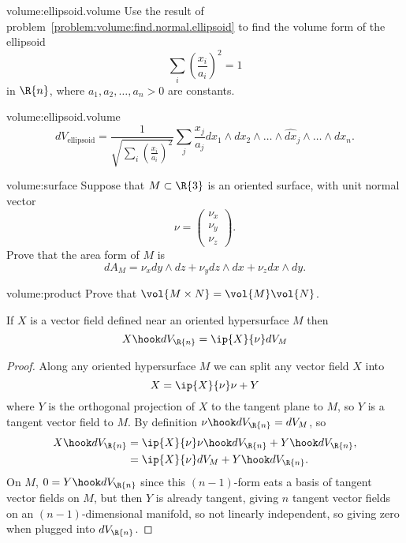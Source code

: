 \begin{problem}{volume:ellipsoid.volume}
Use the result of problem~\vref{problem:volume:find.normal.ellipsoid}
to find the volume form of the ellipsoid
\[
\sum_i \left(\frac{x_i}{a_i}\right)^2 = 1
\]
in \(\R{n}\), where \(a_1, a_2, \dots, a_n > 0\) are constants.
\end{problem}
\begin{answer}{volume:ellipsoid.volume}
\[
dV_{\text{ellipsoid}}
=
\frac{1}{\sqrt{\sum_i \left(\frac{x_i}{a_i}\right)^2}}
\sum_j \frac{x_j}{a_j}
dx_1 \wedge dx_2 \wedge \dots \wedge \widehat{dx}_j \wedge
\dots \wedge dx_n.
\]
\end{answer}

\begin{problem}{volume:surface}
Suppose that \(M \subset \R{3}\) is an oriented surface, with unit normal vector
\[
\nu
=
\begin{pmatrix}
\nu_x \\
\nu_y \\
\nu_z
\end{pmatrix}.
\]
Prove that the area form of \(M\) is
\[
dA_M = \nu_x dy \wedge dz + \nu_y dz \wedge dx + \nu_z dx \wedge dy.
\]
\end{problem}

\begin{problem}{volume:product}
Prove that \(\vol{M \times N}=\vol{M} \vol{N}\).
\end{problem}




\begin{lemma}
If \(X\) is a vector field defined near an oriented hypersurface \(M\) then
\[
X \hook dV_{\R{n}} = \ip{X}{\nu} dV_M
\]
\end{lemma}
\begin{proof}
Along any oriented hypersurface \(M\) we can split any vector field \(X\) into 
\[
X = \ip{X}{\nu} \nu + Y
\]
where \(Y\) is the orthogonal projection of \(X\) to the tangent plane to \(M\), so \(Y\) is a tangent vector field to \(M\).
By definition \(\nu \hook dV_{\R{n}} = dV_M\), so
\begin{align*}
X \hook dV_{\R{n}} 
&= 
\ip{X}{\nu} \nu \hook dV_{\R{n}} + Y \hook dV_{\R{n}},
\\
&=
\ip{X}{\nu} dV_M + Y \hook dV_{\R{n}}.
\end{align*}
On \(M\), \(0=Y \hook dV_{\R{n}}\) since this \((n-1)\)-form eats a basis of tangent vector fields on \(M\), but then \(Y\) is already tangent, giving \(n\) tangent vector fields on an \((n-1)\)-dimensional manifold, so not linearly independent, so giving zero when plugged into \(dV_{\R{n}}\).
\end{proof}

